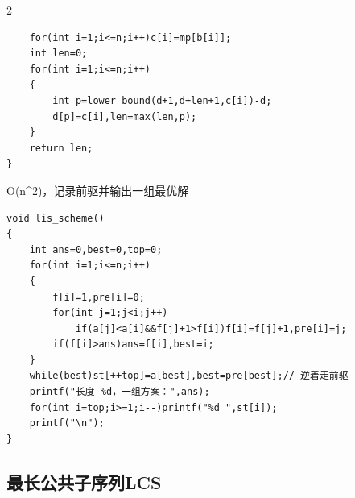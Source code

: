 \documentclass[UTF8,fontset=fandol,a4paper,twoside]{ctexart}
\newcommand{\note}[1]{{\fontsize{10}{12}\selectfont #1\par}}
\begin{document}
\begin{multicols}{2}
\begin{lstlisting}
    for(int i=1;i<=n;i++)c[i]=mp[b[i]];
    int len=0;
    for(int i=1;i<=n;i++)
    {
        int p=lower_bound(d+1,d+len+1,c[i])-d;
        d[p]=c[i],len=max(len,p);
    }
    return len;
}
\end{lstlisting}
\note{O(\allowbreak{}n\textasciicircum{}2)\allowbreak{}，记录前驱并输出一组最优解}
\begin{lstlisting}
void lis_scheme()
{
    int ans=0,best=0,top=0;
    for(int i=1;i<=n;i++)
    {
        f[i]=1,pre[i]=0;
        for(int j=1;j<i;j++)
            if(a[j]<a[i]&&f[j]+1>f[i])f[i]=f[j]+1,pre[i]=j;
        if(f[i]>ans)ans=f[i],best=i;
    }
    while(best)st[++top]=a[best],best=pre[best];// 逆着走前驱
    printf("长度 %d，一组方案：",ans);
    for(int i=top;i>=1;i--)printf("%d ",st[i]);
    printf("\n");
}
\end{lstlisting}
\subsection{最长公共子序列LCS}


\end{multicols}
\end{document}
